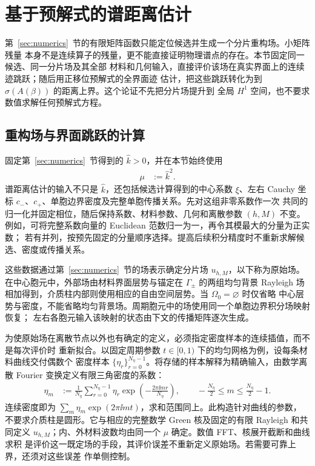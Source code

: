 \section{基于预解式的谱距离估计}
\label{sec:error}

第~\ref{sec:numerics}~节的有限矩阵函数只能定位候选并生成一个分片重构场。小矩阵残量
本身不是连续算子的残量，更不能直接证明物理谱点的存在。本节固定同一候选、同一分片场及其全部
材料和几何输入，直接评价该场在真实界面上的连续迹跳跃；随后用正移位预解式的全界面迹
估计，把这些跳跃转化为到 $\sigma(A(\beta))$ 的距离上界。这个论证不先把分片场提升到
全局 $H^1$ 空间，也不要求数值求解任何预解式方程。

\subsection{重构场与界面跳跃的计算}

固定第~\ref{sec:numerics}~节得到的 $\widehat k>0$，并在本节始终使用
\begin{align}
  \mu&:=\widehat k^2.
  \label{eq:resolvent-candidate-mu}
\end{align}
谱距离估计的输入不只是 $\widehat k$，还包括候选计算得到的中心系数 $\xi$、左右
Cauchy 坐标 $c_-$、$c_+$、单胞边界密度及完整单胞传播关系。先对这组非零系数作一次
共同的归一化并固定相位，随后保持系数、材料参数、几何和离散参数 $(h,M)$ 不变。
例如，可将完整系数向量的 Euclidean 范数归一为一，再令其模最大的分量为正实数；
若有并列，按预先固定的分量顺序选择。提高后续积分精度时不重新求解候选、密度或传播关系。

这些数据通过第~\ref{sec:numerics}~节的场表示确定分片场 $u_{h,M}$，以下称为原始场。
在中心胞元中，外部场由材料界面层势与锚定在 $\Gamma_\pm$ 的两组均匀背景 Rayleigh 场
相加得到，介质柱内部则使用相应的自由空间层势。当 $\Omega_0=\varnothing$ 时仅省略
中心层势与密度，不能省略均匀背景场。周期胞元中的场使用同一个单胞边界积分场映射恢复；
左右各胞元输入该映射的状态由下文的传播矩阵逐次生成。

为使原始场在离散节点以外也有确定的定义，必须指定密度样本的连续插值，而不是每次评价时
重新拟合。以固定周期参数 $t\in[0,1)$ 下的均匀网格为例，设每条材料曲线交付偶数个
密度样本 $\{\eta_r\}_{r=0}^{N_\eta-1}$。将存储的样本解释为精确输入，由数学离散
Fourier 变换定义有限三角密度的系数：
\begin{align}
  \eta_m
  &:=\frac1{N_\eta}\sum_{r=0}^{N_\eta-1}\eta_r
    \exp\!\left(-\frac{2\pi\ii mr}{N_\eta}\right),
  \qquad
  -\frac{N_\eta}{2}\leq m\leq\frac{N_\eta}{2}-1.
  \label{eq:exact-density-dft}
\end{align}
连续密度即为 $\sum_m\eta_m\exp(2\pi\ii mt)$，求和范围同上。此构造针对曲线的参数，
不要求介质柱是圆形。它与相应的完整数学 Green 核及固定的有限 Rayleigh 和共同定义
$u_{h,M}$；内、外材料波数均由同一个 $\mu$ 确定。数值 FFT、核展开截断和曲线求积
是评价这一既定场的手段，其评价误差不重新定义原始场。若需要可靠上界，还须对这些误差
作单侧控制。

